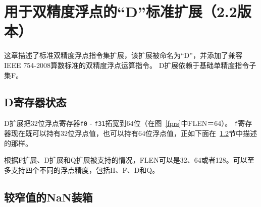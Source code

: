 \chapter{用于双精度浮点的“D”标准扩展（2.2版本）}

这章描述了标准双精度浮点指令集扩展，该扩展被命名为“D”，并添加了兼容IEEE 754-2008算数标准的双精度浮点运算指令。
D扩展依赖于基础单精度指令子集F。

\section{D寄存器状态}

D扩展把32位浮点寄存器{\tt f0} - {\tt f31}拓宽到64位（在图~\ref{fprs}中FLEN＝64）。
{\tt f}寄存器现在既可以持有32位浮点值，也可以持有64位浮点值，正如下面在~\ref{nanboxing}节中描述的那样。

\begin{commentary}
  根据F扩展、D扩展和Q扩展被支持的情况，FLEN可以是32、64或者128。可以至多支持四个不同的浮点精度，包括H、F、D和Q。
\end{commentary}

\section{较窄值的NaN装箱}
\label{nanboxing}

